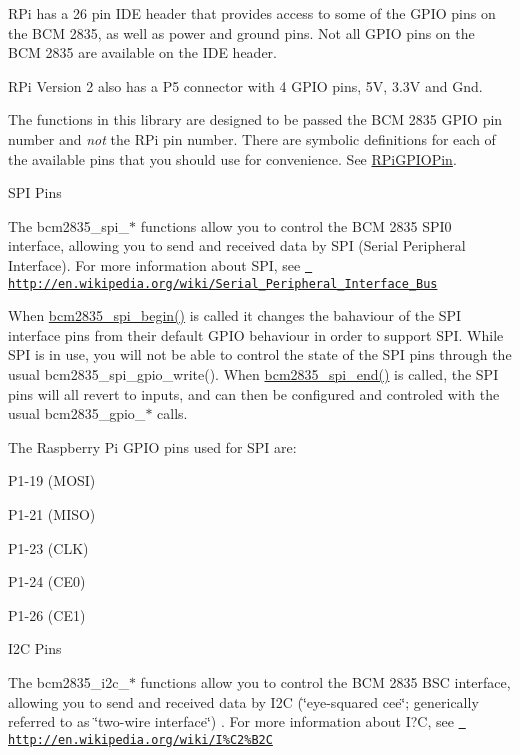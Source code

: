 RPi has a 26 pin IDE header that provides access to some of the GPIO pins on the BCM 2835, as well as power and ground pins. Not all GPIO pins on the BCM 2835 are available on the IDE header.

RPi Version 2 also has a P5 connector with 4 GPIO pins, 5V, 3.\+3V and Gnd.

The functions in this library are designed to be passed the BCM 2835 GPIO pin number and {\itshape not} the RPi pin number. There are symbolic definitions for each of the available pins that you should use for convenience. See \mbox{\hyperlink{group__constants_ga63c029bd6500167152db4e57736d0939}{RPi\+GPIOPin}}.

\begin{DoxyParagraph}{SPI Pins}

\end{DoxyParagraph}
The bcm2835\+\_\+spi\+\_\+$\ast$ functions allow you to control the BCM 2835 SPI0 interface, allowing you to send and received data by SPI (Serial Peripheral Interface). For more information about SPI, see \href{http://en.wikipedia.org/wiki/Serial_Peripheral_Interface_Bus}{\texttt{ http\+://en.\+wikipedia.\+org/wiki/\+Serial\+\_\+\+Peripheral\+\_\+\+Interface\+\_\+\+Bus}}

When \mbox{\hyperlink{group__spi_gac888dc9b78b695f6c13eeeaa813c0d82}{bcm2835\+\_\+spi\+\_\+begin()}} is called it changes the bahaviour of the SPI interface pins from their default GPIO behaviour in order to support SPI. While SPI is in use, you will not be able to control the state of the SPI pins through the usual bcm2835\+\_\+spi\+\_\+gpio\+\_\+write(). When \mbox{\hyperlink{group__spi_gad25421b3a4a6ca280dfdd39c94c3279a}{bcm2835\+\_\+spi\+\_\+end()}} is called, the SPI pins will all revert to inputs, and can then be configured and controled with the usual bcm2835\+\_\+gpio\+\_\+$\ast$ calls.

The Raspberry Pi GPIO pins used for SPI are\+:


\begin{DoxyItemize}
\item P1-\/19 (MOSI)
\item P1-\/21 (MISO)
\item P1-\/23 (CLK)
\item P1-\/24 (CE0)
\item P1-\/26 (CE1)
\end{DoxyItemize}

\begin{DoxyParagraph}{I2C Pins}

\end{DoxyParagraph}
The bcm2835\+\_\+i2c\+\_\+$\ast$ functions allow you to control the BCM 2835 BSC interface, allowing you to send and received data by I2C (\char`\"{}eye-\/squared cee\char`\"{}; generically referred to as \char`\"{}two-\/wire interface\char`\"{}) . For more information about I?C, see \href{http://en.wikipedia.org/wiki/I\%C2\%B2C}{\texttt{ http\+://en.\+wikipedia.\+org/wiki/\+I\%\+C2\%\+B2C}}

